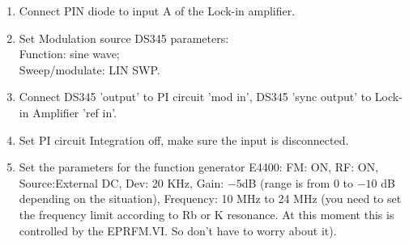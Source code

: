 {\begin{enumerate}
\item Connect PIN diode to input A of the Lock-in amplifier.

\item Set Modulation source DS345 parameters:\\
\indent     Function:  sine wave;\\
\indent     Sweep/modulate: LIN SWP.\\

\item Connect DS345 'output' to PI circuit 'mod in', 
DS345 'sync output' to Lock-in Amplifier 'ref in'.

\item Set PI circuit Integration off, make sure the input is disconnected.

%
%
%
%

\item Set the parameters for the function generator E4400:
FM: ON,
RF: ON,
Source:External DC,
Dev: 20 KHz,
Gain: $-5$dB (range is from 0 to $-10$ dB depending on the situation),
Frequency: 10 MHz to 24 MHz (you need to set the frequency limit according 
to Rb or K resonance. At this moment this is controlled by the EPRFM.VI. 
So don't have to worry about it).


\end{enumerate}}
